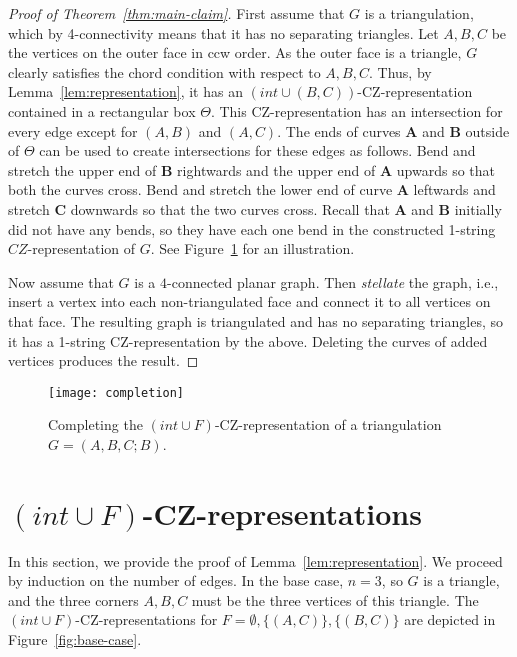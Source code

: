 \documentclass{article}
\renewcommand{\int}[1]{$(\mathit{int}\cup{#1})$}
\newcommand{\bb}[1]{\ensuremath{\mathbf{#1}}}
\begin{document}
\begin{proof}[Proof of Theorem~\ref{thm:main-claim}]
First assume that $G$ is a triangulation, which by 4-con\-nec\-tivity means that
it has no separating triangles. Let $A,B,C$ be the vertices on the outer face
in ccw order.
As the outer face is a triangle, $G$ clearly satisfies the chord condition with respect to $A,B,C$.
Thus, by Lemma~\ref{lem:representation}, it has an
\int{(B,C)}-CZ-representation contained in a rectangular box $\Theta$.  This
CZ-representation has an intersection for 
every edge except for $(A,B)$ and $(A,C)$. The  ends of curves $\bb{A}$ and $\bb{B}$
outside of $\Theta$ can be used to create intersections for these edges
as follows.
Bend and stretch the upper end of $\bb{B}$ rightwards and the upper end of $\bb{A}$ upwards so that
both the curves cross. 
Bend and stretch the lower end of curve $\bb{A}$ leftwards and stretch $\bb{C}$ downwards so that the two curves cross.
Recall that $\bb{A}$ and $\bb{B}$ initially did not have any bends, so they have each one bend in the
constructed 1-string 
$CZ$-representation of $G$. See Figure~\ref{fig:completion} for an illustration.

Now assume that $G$ is a $4$-connected planar graph. Then \emph{stellate} the graph, i.e.,
insert a vertex into each non-triangulated face and connect it to all vertices on that face.
The resulting graph is triangulated and has no separating triangles, so it has a 1-string CZ-representation
by the above. Deleting the curves of added vertices produces the result. 
\end{proof}

\begin{figure}
    \centering
    \texttt{[image: completion]}
    \caption{Completing the \int{F}-CZ-representation of a triangulation $G = (A,B,C;B)$.}
    \label{fig:completion}
\end{figure}


\section{\int{F}-CZ-representations}
\label{sec:proof}

In this section, we provide the proof of Lemma~\ref{lem:representation}.
We proceed by induction on the number of edges. In the base case, $n=3$, so
$G$ is a triangle, and the three corners $A,B,C$ must be the three vertices 
of this triangle.  The \int{F}-CZ-representations 
for $F=\emptyset, \{(A,C)\}, \{(B,C)\}$
are depicted in Figure~\ref{fig:base-case}.
\end{document}
